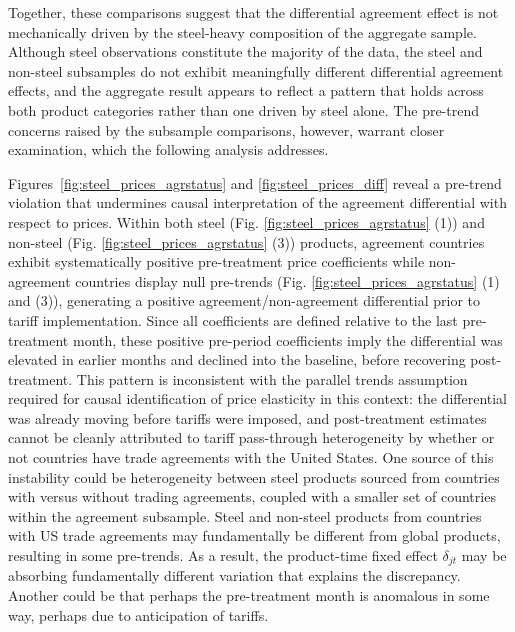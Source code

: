 Together, these comparisons suggest that the differential agreement effect is not mechanically driven by the steel-heavy composition of the aggregate sample. Although steel observations constitute the majority of the data, the steel and non-steel subsamples do not exhibit meaningfully different differential agreement effects, and the aggregate result appears to reflect a pattern that holds across both product categories rather than one driven by steel alone. The pre-trend concerns raised by the subsample comparisons, however, warrant closer examination, which the following analysis addresses.

Figures~\ref{fig:steel_prices_agrstatus} and \ref{fig:steel_prices_diff} reveal a pre-trend violation that undermines causal interpretation of the agreement differential with respect to prices. Within both steel (Fig. \ref{fig:steel_prices_agrstatus} (1)) and non-steel (Fig. \ref{fig:steel_prices_agrstatus} (3)) products, agreement countries exhibit systematically positive pre-treatment price coefficients while non-agreement countries display null pre-trends (Fig. \ref{fig:steel_prices_agrstatus} (1) and (3)), generating a positive agreement/non-agreement differential prior to tariff implementation. Since all coefficients are defined relative to the last pre-treatment month, these positive pre-period coefficients imply the differential was elevated in earlier months and declined into the baseline, before recovering post-treatment. This pattern is inconsistent with the parallel trends assumption required for causal identification of price elasticity in this context: the differential was already moving before tariffs were imposed, and post-treatment estimates cannot be cleanly attributed to tariff pass-through heterogeneity by whether or not countries have trade agreements with the United States. One source of this instability could be heterogeneity between steel products sourced from countries with versus  without trading agreements, coupled with a smaller set of countries within the agreement subsample. Steel and non-steel products from countries with US trade agreements may fundamentally be different from global products, resulting in some pre-trends. As a result, the product-time fixed effect $\delta_{jt}$ may be absorbing fundamentally different variation that explains the discrepancy. Another could be that perhaps the pre-treatment month is anomalous in some way, perhaps due to anticipation of tariffs. 

